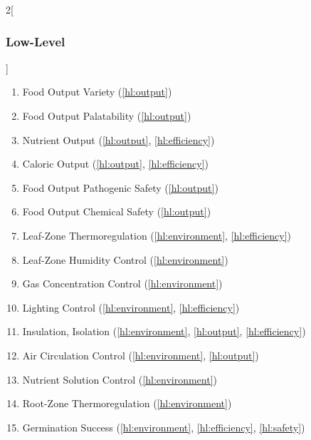 \documentclass{../tex/report}
\begin{document}
\begin{multicols}{2}[\subsubsection{Low-Level}\label{sec:llos}]
    \begin{enumerate}[label=LL\arabic*., ref=LL\arabic*]
        \item \label{ll:output_variety} Food Output Variety                 \hfill (\ref{hl:output})
        \item \label{ll:output_palatability} Food Output Palatability       \hfill (\ref{hl:output})
        \item \label{ll:output_nutrients} Nutrient Output                   \hfill (\ref{hl:output}, \ref{hl:efficiency})
        \item \label{ll:output_energy} Caloric Output                       \hfill (\ref{hl:output}, \ref{hl:efficiency})
        \item \label{ll:output_pathogen} Food Output Pathogenic Safety      \hfill (\ref{hl:output})
        \item \label{ll:output_chemical} Food Output Chemical Safety        \hfill (\ref{hl:output})
        \item \label{ll:control_airtemp} Leaf-Zone Thermoregulation         \hfill (\ref{hl:environment}, \ref{hl:efficiency})
        \item \label{ll:control_airhum} Leaf-Zone Humidity Control          \hfill (\ref{hl:environment})
        \item \label{ll:control_gas} Gas Concentration Control              \hfill (\ref{hl:environment})
        \item \label{ll:control_light} Lighting Control                     \hfill (\ref{hl:environment}, \ref{hl:efficiency})
        \item \label{ll:insulateisolate} Insulation, Isolation              \hfill (\ref{hl:environment}, \ref{hl:output}, \ref{hl:efficiency})
        \item \label{ll:control_aircirculation} Air Circulation Control     \hfill (\ref{hl:environment}, \ref{hl:output})
        \item \label{ll:control_nutrientsolution} Nutrient Solution Control \hfill (\ref{hl:environment})
        \item \label{ll:control_roottemp} Root-Zone Thermoregulation \hfill (\ref{hl:environment})
        \item \label{ll:germinationsuccess} Germination Success \hfill (\ref{hl:environment}, \ref{hl:efficiency}, \ref{hl:safety})

\end{enumerate}
\end{multicols}
\end{document}
